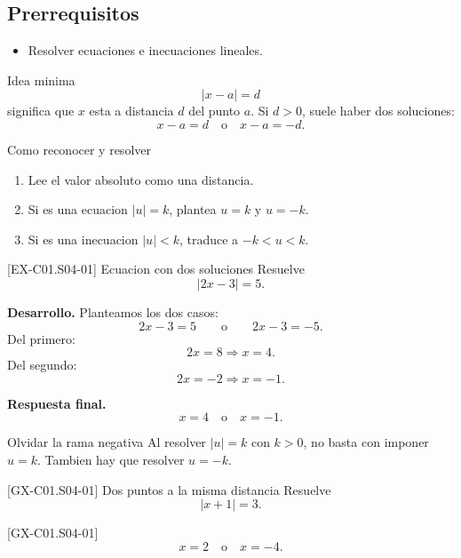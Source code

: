 \subsection*{Prerrequisitos}
\begin{itemize}
  \item Resolver ecuaciones e inecuaciones lineales.
\end{itemize}

\begin{theorybox}{Idea minima}
\[
|x-a|=d
\]
significa que \(x\) esta a distancia \(d\) del punto \(a\). Si \(d>0\), suele haber dos
soluciones:
\[
x-a=d \quad \text{o} \quad x-a=-d.
\]
\end{theorybox}

\begin{methodbox}{Como reconocer y resolver}
\begin{enumerate}
  \item Lee el valor absoluto como una distancia.
  \item Si es una ecuacion \(|u|=k\), plantea \(u=k\) y \(u=-k\).
  \item Si es una inecuacion \(|u|<k\), traduce a \(-k<u<k\).
\end{enumerate}
\end{methodbox}

\begin{solvedexample}{[EX-C01.S04-01] Ecuacion con dos soluciones}
Resuelve
\[
|2x-3|=5.
\]

\textbf{Desarrollo.} Planteamos los dos casos:
\[
2x-3=5
\qquad \text{o} \qquad
2x-3=-5.
\]
Del primero:
\[
2x=8 \Longrightarrow x=4.
\]
Del segundo:
\[
2x=-2 \Longrightarrow x=-1.
\]

\textbf{Respuesta final.}
\[
x=4 \quad \text{o} \quad x=-1.
\]
\end{solvedexample}

\begin{commonerror}{Olvidar la rama negativa}
Al resolver \(|u|=k\) con \(k>0\), no basta con imponer \(u=k\). Tambien hay que resolver
\(u=-k\).
\end{commonerror}

\begin{guidedexercise}{[GX-C01.S04-01] Dos puntos a la misma distancia}
Resuelve
\[
|x+1|=3.
\]
\end{guidedexercise}

\begin{shortanswer}{[GX-C01.S04-01]}
\[
x=2 \quad \text{o} \quad x=-4.
\]
\end{shortanswer}

